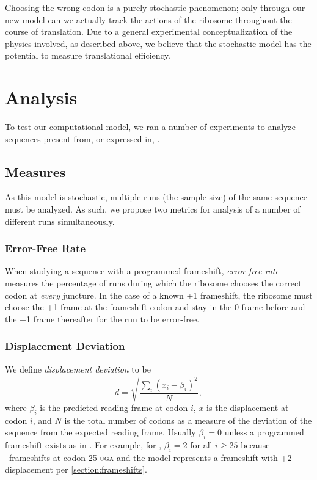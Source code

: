 \documentclass[12pt]{article}
\begin{document}
Choosing the wrong codon is a purely stochastic phenomenon; only through our new
model can we actually track the actions of the ribosome throughout the course
of translation.  Due to a general experimental conceptualization of the physics involved,
as described above, we believe that the stochastic model has the potential to 
measure translational efficiency.

\section{Analysis}
To test our computational model, we ran a number of
experiments to analyze sequences present from, or expressed in, \ecoli.

\subsection{Measures}
\label{section:metrics}

As this model is stochastic, multiple runs (the sample size) of the same sequence must be analyzed.
As such, we propose two metrics for analysis of a number of different runs 
simultaneously. 

\subsubsection{Error-Free Rate}
\label{section:efr}
When studying a
sequence with a programmed frameshift, \emph{error-free rate} measures the percentage of runs 
during which the ribosome chooses the correct codon
at \emph{every} juncture.  In the case of a known +1 frameshift, the ribosome must
choose the +1 frame at the frameshift codon and stay in the 0 frame before
and the +1 frame thereafter for the run to be error-free.

\subsubsection{Displacement Deviation}
\label{section:deviation}

We define \emph{displacement deviation} to be
\begin{equation}
    d = \sqrt{\frac{\sum_i (x_i - \beta_i)^2}{N}},
\end{equation}
where $\beta_i$ is the predicted reading frame at codon $i$, $x$ is
the displacement at codon $i$, and $N$ is the total number of codons
as a measure of the deviation of the sequence from the expected
reading frame.  Usually $\beta_i = 0$ unless a programmed frameshift
exists as in \prfB.  For example, for \prfB, $\beta_i = 2$
for all $i \geq 25$ because \prfB\ frameshifts at codon 25
\textsc{uga} and the model represents a frameshift with +2
displacement per \autoref{section:frameshifts}.
\end{document}
